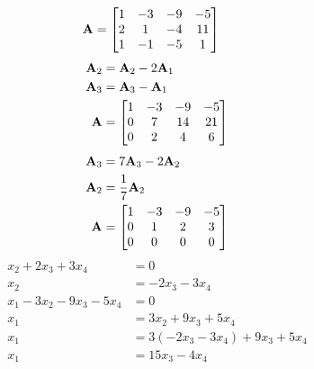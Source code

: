\documentclass{article}
\begin{document}
\begin{align*}
	\mathbf{A} & =
		\begin{bmatrix}
			1 & -3 & -9 & -5 \\
			2 & 1 & -4 & 11 \\
			1 & -1 & -5 & 1
		\end{bmatrix}
\end{align*}
\begin{align*}
	\mathbf{A}_2 & = \mathbf{A}_2 - 2\mathbf{A}_1 \\
	\mathbf{A}_3 & = \mathbf{A}_3 - \mathbf{A}_1 \\
	\mathbf{A} & =
		\begin{bmatrix}
			1 & -3 & -9 & -5 \\
			0 & 7 & 14 & 21 \\
			0 & 2 & 4 & 6
		\end{bmatrix}
\end{align*}
\begin{align*}
	\mathbf{A}_3 & = 7\mathbf{A}_3 - 2\mathbf{A}_2 \\
	\mathbf{A}_2 & = \frac{1}{7}\mathbf{A}_2 \\
	\mathbf{A} & =
		\begin{bmatrix}
			1 & -3 & -9 & -5 \\
			0 & 1 & 2 & 3 \\
			0 & 0 & 0 & 0
		\end{bmatrix}
\end{align*}
\begin{align*}
	x_2 + 2x_3 + 3x_4 & = 0 \\
	x_2 & = -2x_3 - 3x_4 \\
	x_1 - 3x_2 - 9x_3 - 5x_4 & = 0 \\
	x_1 & = 3x_2 + 9x_3 + 5x_4 \\
	x_1 & = 3(-2x_3 - 3x_4) + 9x_3 + 5x_4 \\
	x_1 & = 15x_3 - 4x_4
\end{align*}
\end{document}
